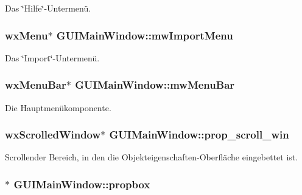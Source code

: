 Das \char`\"{}\-Hilfe\char`\"{}-\/\-Untermenü. \hypertarget{classGUIMainWindow_afaff9e1bec11b0f80215ceba76e87bc4}{
\subsubsection[{mw\-Import\-Menu}]{\setlength{\rightskip}{0pt plus 5cm}wx\-Menu$\ast$ G\-U\-I\-Main\-Window\-::mw\-Import\-Menu\hspace{0.3cm}{\ttfamily [private]}}}\label{classGUIMainWindow_afaff9e1bec11b0f80215ceba76e87bc4}
Das \char`\"{}\-Import\char`\"{}-\/\-Untermenü. \hypertarget{classGUIMainWindow_a057a6728bf9aa994f41060ebe15a28ac}{
\subsubsection[{mw\-Menu\-Bar}]{\setlength{\rightskip}{0pt plus 5cm}wx\-Menu\-Bar$\ast$ G\-U\-I\-Main\-Window\-::mw\-Menu\-Bar\hspace{0.3cm}{\ttfamily [private]}}}\label{classGUIMainWindow_a057a6728bf9aa994f41060ebe15a28ac}
Die Hauptmenükomponente. \hypertarget{classGUIMainWindow_a1c120efb232cf3d371a3a6231619b808}{
\subsubsection[{prop\-\_\-scroll\-\_\-win}]{\setlength{\rightskip}{0pt plus 5cm}wx\-Scrolled\-Window$\ast$ G\-U\-I\-Main\-Window\-::prop\-\_\-scroll\-\_\-win\hspace{0.3cm}{\ttfamily [private]}}}\label{classGUIMainWindow_a1c120efb232cf3d371a3a6231619b808}
Scrollender Bereich, in den die Objekteigenschaften-\/\-Oberfläche eingebettet ist. \hypertarget{classGUIMainWindow_a4959774563543927a492bf06e441920e}{
\subsubsection[{propbox}]{$\ast$ G\-U\-I\-Main\-Window\-::propbox\hspace{0.3cm}{\ttfamily [private]}}}\label{classGUIMainWindow_a4959774563543927a492bf06e441920e}
